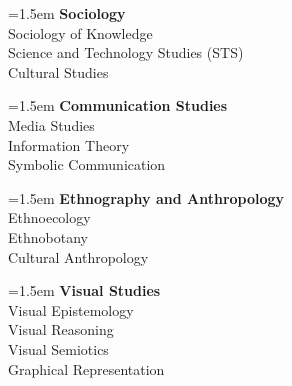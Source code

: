 \begin{multicols}{2}
\noindent\hangindent=1.5em \textbf{Sociology} \\
Sociology of Knowledge \\
Science and Technology Studies (STS) \\
Cultural Studies \\
\vspace{4mm}

\noindent\hangindent=1.5em \textbf{Communication Studies} \\
Media Studies \\
Information Theory \\
Symbolic Communication \\
\vspace{4mm}

\noindent\hangindent=1.5em \textbf{Ethnography and Anthropology} \\
Ethnoecology \\
Ethnobotany \\
Cultural Anthropology \\
\vspace{4mm}

\noindent\hangindent=1.5em \textbf{Visual Studies} \\
Visual Epistemology \\
Visual Reasoning \\
Visual Semiotics \\
Graphical Representation \\
\end{multicols}

\clearpage

